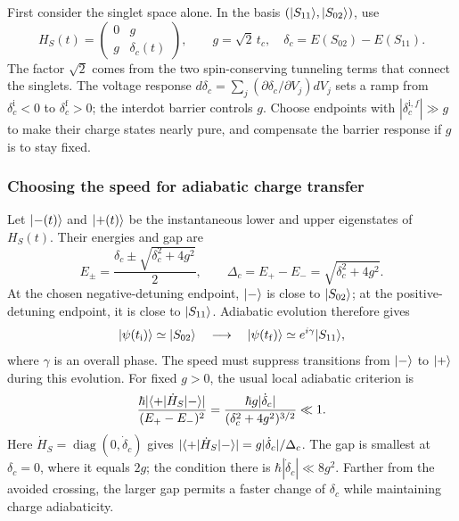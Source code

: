 First consider the singlet space alone. In the basis
$(\lvert S_{11}\rangle,\lvert S_{02}\rangle)$, use
\begin{equation}
 H_S(t)=
 \begin{pmatrix}0&g\\g&\delta_c(t)\end{pmatrix},\qquad
 g=\sqrt2\,t_c,\quad
 \delta_c=E(S_{02})-E(S_{11}).
 \label{eq:calibration-singlet-charge-ramp}
\end{equation}
The factor $\sqrt2$ comes from the two spin-conserving tunneling
terms that connect the singlets. The voltage response
$d\delta_c=\sum_j(\partial\delta_c/\partial V_j)dV_j$ sets a
ramp from $\delta_c^{\mathrm i}<0$ to $\delta_c^{\mathrm f}>0$;
the interdot barrier controls $g$. Choose endpoints with
$|\delta_c^{\mathrm i,f}|\gg g$ to make their charge states nearly
pure, and compensate the barrier response if $g$ is to stay fixed.

\subsubsection{Choosing the speed for adiabatic charge transfer}
Let $\lvert -(t)\rangle$ and $\lvert +(t)\rangle$ be the instantaneous lower and
upper eigenstates of $H_S(t)$. Their energies and gap are
\[
 E_\pm=\frac{\delta_c\pm\sqrt{\delta_c^2+4g^2}}2,
 \qquad \Delta_c=E_+-E_-=\sqrt{\delta_c^2+4g^2}.
\]
At the chosen negative-detuning endpoint, $\lvert -\rangle$ is close to
$\lvert S_{02}\rangle$; at the positive-detuning endpoint, it is close to
$\lvert S_{11}\rangle$. Adiabatic evolution therefore gives
\[
 \lvert \psi(t_{\mathrm i})\rangle\simeq\lvert S_{02}\rangle
 \quad\longrightarrow\quad
 \lvert \psi(t_{\mathrm f})\rangle\simeq e^{i\gamma}\lvert S_{11}\rangle,
\]
where $\gamma$ is an overall phase. The speed must suppress
transitions from $\lvert -\rangle$ to $\lvert +\rangle$ during this evolution.
For fixed $g>0$, the usual local adiabatic criterion is
\begin{equation}
 \frac{\hbar|\bra{+}\dot H_S\ket{-}|}{(E_+-E_-)^2}
 =\frac{\hbar g|\dot\delta_c|}
      {(\delta_c^2+4g^2)^{3/2}}\ll1.
 \label{eq:calibration-charge-ramp-condition}
\end{equation}
Here $\dot H_S=\operatorname{diag}(0,\dot\delta_c)$ gives
$|\langle +\rvert\dot H_S\lvert -\rangle|=g|\dot\delta_c|/\Delta_c$.
The gap is smallest at $\delta_c=0$, where it equals $2g$;
the condition there is $\hbar|\dot\delta_c|\ll8g^2$.
Farther from the avoided crossing, the larger gap permits a faster
change of $\delta_c$ while maintaining charge adiabaticity.

